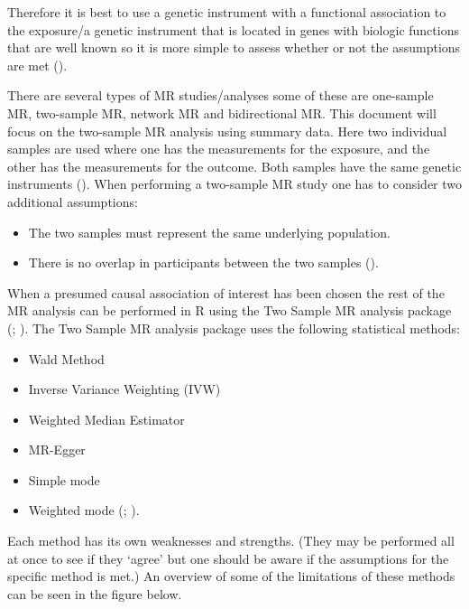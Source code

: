 \documentclass[
]{article}
\providecommand{\tightlist}{%
  \setlength{\itemsep}{0pt}\setlength{\parskip}{0pt}}
\begin{document}
Therefore it is best to use a genetic instrument with a functional
association to the exposure/a genetic instrument that is located in
genes with biologic functions that are well known so it is more simple
to assess whether or not the assumptions are met
().

There are several types of MR studies/analyses some of these are
one-sample MR, two-sample MR, network MR and bidirectional MR. This
document will focus on the two-sample MR analysis using summary data.
Here two individual samples are used where one has the measurements for
the exposure, and the other has the measurements for the outcome. Both
samples have the same genetic instruments
(). When performing a
two-sample MR study one has to consider two additional assumptions:

\begin{itemize}
\tightlist
\item
  The two samples must represent the same underlying population.
\item
  There is no overlap in participants between the two samples
  ().
\end{itemize}

When a presumed causal association of interest has been chosen the rest
of the MR analysis can be performed in R using the Two Sample MR
analysis package (;
). The
Two Sample MR analysis package uses the following statistical methods:

\begin{itemize}
\tightlist
\item
  Wald Method
\item
  Inverse Variance Weighting (IVW)
\item
  Weighted Median Estimator
\item
  MR-Egger
\item
  Simple mode
\item
  Weighted mode (;
  ).
\end{itemize}

Each method has its own weaknesses and strengths. (They may be performed
all at once to see if they `agree' but one should be aware if the
assumptions for the specific method is met.) An overview of some of the
limitations of these methods can be seen in the figure below.
\end{document}
